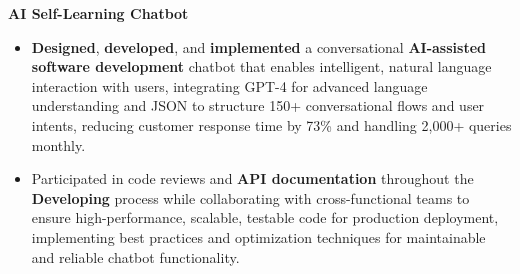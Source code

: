 \documentclass[a4paper,10pt]{article}
\begin{document}
\vspace{-2mm}
\textbf{AI Self-Learning Chatbot} \\
\begin{itemize}[leftmargin=*, itemsep=0pt, parsep=1pt]
\vspace{-7mm}
    \item \textbf{Designed}, \textbf{developed}, and \textbf{implemented} a conversational \textbf{AI-assisted software development} chatbot that enables intelligent, natural language interaction with users, integrating GPT-4 for advanced language understanding and JSON to structure 150+ conversational flows and user intents, reducing customer response time by 73\% and handling 2,000+ queries monthly.
    \item Participated in code reviews and \textbf{API documentation} throughout the \textbf{Developing} process while collaborating with cross-functional teams to ensure high-performance, scalable, testable code for production deployment, implementing best practices and optimization techniques for maintainable and reliable chatbot functionality.
\end{itemize}

\vspace{-2mm}
\end{document}
